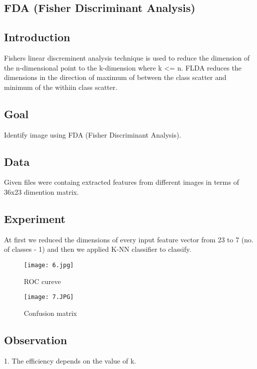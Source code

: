 \begin{center}
\section{FDA (Fisher Discriminant Analysis)}
\end{center}

\subsection{Introduction}
\begin{flushleft}
Fishers linear discreminent analysis technique is used to reduce the dimension of the n-dimensional point to the k-dimension where k <= n. FLDA reduces the dimensions in the direction of maximum of between the class scatter and minimum of the withiin class scatter. 
\end{flushleft}

\subsection{Goal}
\begin{flushleft}
    Identify image using FDA (Fisher Discriminant Analysis).
\end{flushleft}

\subsection{Data}
\begin{flushleft}
    Given files were containg extracted features from different images in terms of 36x23 dimention matrix.
\end{flushleft}


\subsection{Experiment}
\begin{flushleft}
  At first we reduced the dimensions of every input feature vector from 23 to 7 (no. of classes - 1) and then we applied K-NN classifier to classify.
  
\begin{figure}[!htb]
\begin{center}
  \texttt{[image: 6.jpg]}
  \caption{ROC cureve}\label{fig:fig_a}
\endminipage\hfill
\end{center}
\end{figure}
\break
\begin{figure}[!htb]
\begin{center}
  \texttt{[image: 7.JPG]}
  \caption{Confusion matrix}\label{fig:fig_a}
\endminipage\hfill
\end{center}
\end{figure}
 \break
\end{flushleft}

\subsection{Observation}
\begin{flushleft}
  1. The efficiency depends on the value of k.
\end{flushleft}

\break
